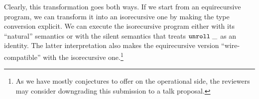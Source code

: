 Clearly, this transformation goes both ways. If we start from an
equirecursive program, we can transform it into an isorecursive one by
making the type conversion explicit. We can execute the isorecursive
program either with its ``natural'' semantics or with the silent
semantics that treats $\mathtt{unroll}\; \_$ as an identity.
The latter interpretation also makes the equirecursive version
``wire-compatible'' with the isorecursive one.\footnote{As we have
  mostly conjectures to offer on the operational side, the reviewers
  may consider downgrading this submission to a talk proposal.}
  


